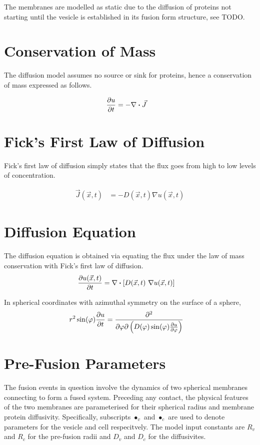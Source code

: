 \documentclass{report}
\newcommand\Par[1]{{ \left({#1}\right) }}
\newcommand\Brack[1]{{ \left[{#1}\right] }}
\begin{document}
The membranes are modelled as static due to the diffusion of proteins not starting until the vesicle is established in its fusion form structure, see TODO.

\section{Conservation of Mass}
The diffusion model assumes no source or sink for proteins, hence a conservation of mass expressed as follows.

\begin{align*}
	\pdv{u}{t} &= -\nabla \dotproduct \vec{J}
\end{align*}

\section{Fick's First Law of Diffusion}
Fick's first law of diffusion simply states that the flux goes from high to low levels of concentration.

\begin{align*}
	\vec{J}(\vec{x}, t) &= -D(\vec{x}, t) \nabla{u(\vec{x}, t)}
\end{align*}

\section{Diffusion Equation}
The diffusion equation is obtained via equating the flux under the law of mass conservation with Fick's first law of diffusion.
\begin{align*}
	\pdv{u(\vec{x}, t)}{t} &= \nabla \dotproduct \Brack{D(\vec{x}, t)\ \nabla{u(\vec{x}, t)}}
\end{align*}

In spherical coordinates with azimuthal symmetry on the surface of a sphere,
\begin{align*}
	r^2 \sin(\varphi) \pdv{u}{t} &= \pdv{}{\varphi}\Par{D(\varphi) \sin(\varphi) \pdv{u}{\varphi}}
\end{align*}

\section{Pre-Fusion Parameters}
The fusion events in question involve the dynamics of two spherical membranes connecting to form a fused system. Preceding any contact, the physical features of the two membranes are parameterised for their spherical radius and membrane protein diffusivity. Specifically, subscripts $\bullet_v$ and $\bullet_c$ are used to denote parameters for the vesicle and cell respecitvely. The model input constants are $R_v$ and $R_c$ for the pre-fusion radii and $D_v$ and $D_c$ for the diffusivites.
\end{document}
